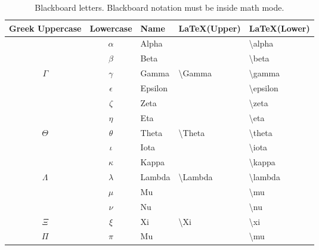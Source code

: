 \begin{table}[!htb]
\begin{tabularx}{\linewidth}{ c c l l l } \hline
  Greek Uppercase & Lowercase & Name  & \LaTeX (Upper)       & \LaTeX (Lower) \\
  \hline
                  & $\alpha$   & Alpha   &                       & \textbackslash alpha \\
                  & $\beta$    & Beta    &                       & \textbackslash beta \\
  $\Gamma$        & $\gamma$   & Gamma   & \textbackslash Gamma  & \textbackslash gamma \\
                  & $\epsilon$ & Epsilon &                       & \textbackslash epsilon \\
                  & $\zeta$    & Zeta    &                       & \textbackslash zeta \\
                  & $\eta$     & Eta     &                       & \textbackslash eta \\
  $\Theta$        & $\theta$   & Theta   & \textbackslash Theta  & \textbackslash theta \\
                  & $\iota$    & Iota    &                       & \textbackslash iota \\
                  & $\kappa$   & Kappa   &                       & \textbackslash kappa \\
  $\Lambda$       & $\lambda$  & Lambda  & \textbackslash Lambda & \textbackslash lambda \\
                  & $\mu$      & Mu      &                       & \textbackslash mu \\
                  & $\nu$      & Nu      &                       & \textbackslash nu \\
  $\Xi$           & $\xi$      & Xi      & \textbackslash Xi     & \textbackslash xi \\
  $\Pi$           & $\pi$      & Mu      &                       & \textbackslash mu \\
\end{tabularx}
\caption{Blackboard letters. Blackboard notation must be inside math mode.}
\label{tab:BlackboardLetters}
\end{table}



